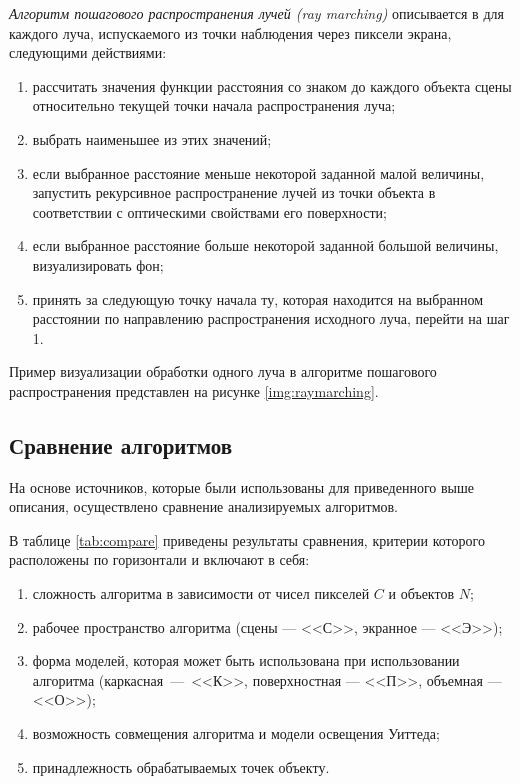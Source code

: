 \textit{Алгоритм пошагового распространения лучей (ray marching)} описывается в \cite{bredenbals2022visualising} для каждого луча, испускаемого из точки наблюдения через пиксели экрана, следующими действиями:
\begin{enumerate}
	\item рассчитать значения функции расстояния со знаком до каждого объекта сцены относительно текущей точки начала распространения луча;
	\item выбрать наименьшее из этих значений;
	\item если выбранное расстояние меньше некоторой заданной малой величины, запустить рекурсивное распространение лучей из точки объекта в соответствии с оптическими свойствами его поверхности;
	\item если выбранное расстояние больше некоторой заданной большой величины, визуализировать фон;
	\item принять за следующую точку начала ту, которая находится на выбранном расстоянии по направлению распространения исходного луча, перейти на шаг 1.
\end{enumerate}

Пример визуализации обработки одного луча в алгоритме пошагового распространения представлен на рисунке \ref{img:raymarching}.


\subsection{Сравнение алгоритмов}

На основе источников, которые были использованы для приведенного выше описания, осуществлено сравнение анализируемых алгоритмов.

В таблице \ref{tab:compare} приведены результаты сравнения, критерии которого расположены по горизонтали и включают в себя:
\begin{enumerate}
	\item сложность алгоритма в зависимости от чисел пикселей $C$ и объектов $N$;
	\item рабочее пространство алгоритма (сцены --- <<С>>, экранное --- <<Э>>);
	\item форма моделей, которая может быть использована при использовании алгоритма (каркасная~---~<<К>>, поверхностная --- <<П>>, объемная --- <<О>>);
	\item возможность совмещения алгоритма и модели освещения Уиттеда;
	\item принадлежность обрабатываемых точек объекту.
\end{enumerate}


